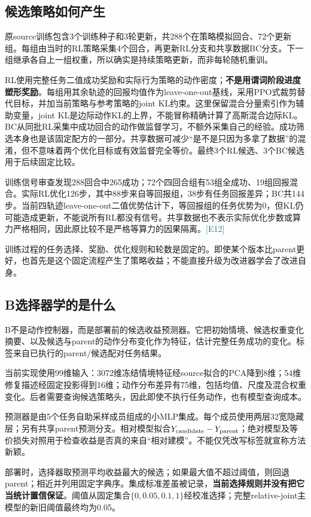 \documentclass[UTF8,a4paper,fontset=none,zihao=-4]{ctexart}
\newcommand{\ev}[1]{\textcolor{teal}{\small[#1]}}
\begin{document}
\subsection{候选策略如何产生}
原source训练包含3个训练种子和3轮更新，共288个在策略模拟回合、72个更新组。每组由当时的RL策略采集4个回合，再更新RL分支和共享数据BC分支。下一组继承各自上一组权重，所以确实是持续策略更新，而非每轮随机重训。

RL使用完整任务二值成功奖励和实际行为策略的动作密度；\textbf{不是用谓词阶段进度塑形奖励}。每组用其余轨迹的回报均值作为leave-one-out基线，采用PPO式裁剪替代目标，并加当前策略与参考策略的joint KL约束。这里保留混合分量索引作为辅助变量，joint KL是边际动作KL的上界，不能冒称精确计算了高斯混合边际KL。BC从同批RL采集中成功回合的动作做监督学习，不额外采集自己的经验。成功筛选本身也是该固定配方的一部分。共享数据可减少“是不是只因为多拿了数据”的混淆，但不意味着两个优化目标或有效监督完全等价。最终3个RL候选、3个BC候选用于后续固定比较。

训练信号审查发现288回合中265成功；72个四回合组有53组全成功、19组回报混合。实际RL优化126步，其中88步来自等回报组，38步有任务回报差异；BC共144步。当前四轨迹leave-one-out二值优势估计下，等回报组的任务优势为0，但KL仍可能造成更新，不能说所有RL都没有信号。共享数据也不表示实际优化步数或算力严格相同，因此原比较不是严格等算力的因果隔离。\ev{E12}

训练过程的任务选择、奖励、优化规则和轮数是固定的。即使某个版本比parent更好，也首先是这个固定流程产生了策略收益；不能直接升级为改进器学会了改进自身。
\subsection{B选择器学的是什么}
B不是动作控制器，而是部署前的候选收益预测器。它把初始情境、候选权重变化摘要、以及候选与parent的动作分布变化作为特征，估计完整任务成功的变化。标签来自已执行的parent/候选配对任务结果。

当前实现使用99维输入：3072维冻结情境特征经source拟合的PCA降到8维；54维修复描述经固定投影得到16维；动作分布差异有75维，包括均值、尺度及混合权重变化。后者需要查询候选策略头，因此即使不执行任务动作，也有模型查询成本。

预测器是由5个任务自助采样成员组成的小MLP集成。每个成员使用两层32宽隐藏层；另有共享parent预测分支。相对模型拟合$Y_{\rm candidate}-Y_{\rm parent}$；绝对模型及等价损失对照用于检查收益是否真的来自“相对建模”。不能仅凭改写标签就宣称方法新颖。

部署时，选择器取预测平均收益最大的候选；如果最大值不超过阈值，则回退parent；相近并列用固定字典序。集成标准差虽被记录，\textbf{当前选择规则并没有把它当统计置信保证}。阈值从固定集合$\{0,0.05,0.1,1\}$经校准选择；完整relative-joint主模型的新旧阈值最终均为0.05。
\end{document}
